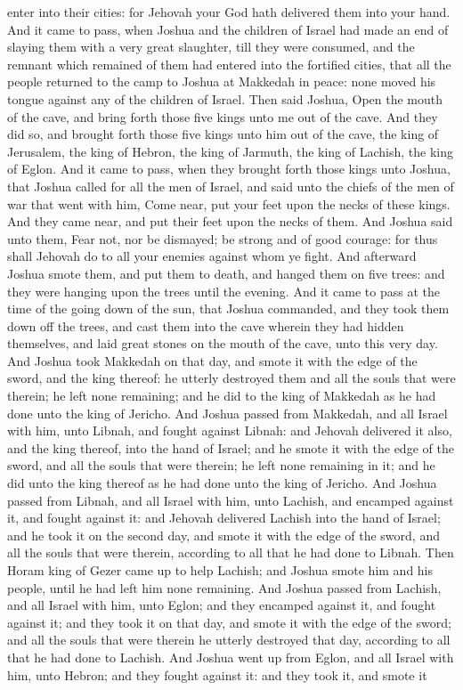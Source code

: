 enter into their cities: for Jehovah your God hath delivered them into your hand. And it came to pass, when Joshua and the children of Israel had made an end of slaying them with a very great slaughter, till they were consumed, and the remnant which remained of them had entered into the fortified cities, that all the people returned to the camp to Joshua at Makkedah in peace: none moved his tongue against any of the children of Israel.  Then said Joshua, Open the mouth of the cave, and bring forth those five kings unto me out of the cave. And they did so, and brought forth those five kings unto him out of the cave, the king of Jerusalem, the king of Hebron, the king of Jarmuth, the king of Lachish, the king of Eglon. And it came to pass, when they brought forth those kings unto Joshua, that Joshua called for all the men of Israel, and said unto the chiefs of the men of war that went with him, Come near, put your feet upon the necks of these kings. And they came near, and put their feet upon the necks of them. And Joshua said unto them, Fear not, nor be dismayed; be strong and of good courage: for thus shall Jehovah do to all your enemies against whom ye fight. And afterward Joshua smote them, and put them to death, and hanged them on five trees: and they were hanging upon the trees until the evening. And it came to pass at the time of the going down of the sun, that Joshua commanded, and they took them down off the trees, and cast them into the cave wherein they had hidden themselves, and laid great stones on the mouth of the cave, unto this very day.  And Joshua took Makkedah on that day, and smote it with the edge of the sword, and the king thereof: he utterly destroyed them and all the souls that were therein; he left none remaining; and he did to the king of Makkedah as he had done unto the king of Jericho.  And Joshua passed from Makkedah, and all Israel with him, unto Libnah, and fought against Libnah: and Jehovah delivered it also, and the king thereof, into the hand of Israel; and he smote it with the edge of the sword, and all the souls that were therein; he left none remaining in it; and he did unto the king thereof as he had done unto the king of Jericho.  And Joshua passed from Libnah, and all Israel with him, unto Lachish, and encamped against it, and fought against it: and Jehovah delivered Lachish into the hand of Israel; and he took it on the second day, and smote it with the edge of the sword, and all the souls that were therein, according to all that he had done to Libnah.  Then Horam king of Gezer came up to help Lachish; and Joshua smote him and his people, until he had left him none remaining.  And Joshua passed from Lachish, and all Israel with him, unto Eglon; and they encamped against it, and fought against it; and they took it on that day, and smote it with the edge of the sword; and all the souls that were therein he utterly destroyed that day, according to all that he had done to Lachish.  And Joshua went up from Eglon, and all Israel with him, unto Hebron; and they fought against it: and they took it, and smote it 